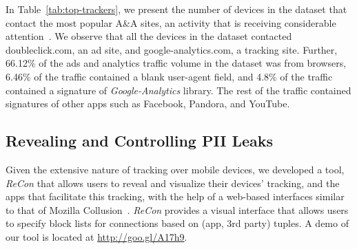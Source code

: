 In Table~\ref{tab:top-trackers}, we present the number of devices in the \mobWild dataset that contact the most popular A\&A sites, an activity that is receiving considerable attention~\cite{roesner:webtrackers,leontiadis:mobileads,vallina-rod:ads}.
We observe that all the devices in the \mobWild dataset contacted doubleclick.com, an ad site, and google-analytics.com, a tracking site. 
Further, 66.12\% of the ads and analytics traffic volume in the \mobWild dataset was from browsers, 6.46\% of the
traffic contained a blank user-agent field, and 4.8\% of the traffic contained a signature of \emph{Google-Analytics} library.
The rest of the traffic contained signatures of other apps such as Facebook, Pandora, and YouTube.

\subsection{Revealing and Controlling PII Leaks}
Given the extensive nature of tracking over mobile devices, we developed a tool, 
\emph{ReCon} that allows users to reveal and visualize their devices' tracking, and the 
apps that facilitate this tracking, with the help of a web-based interfaces similar to that of 
Mozilla Collusion~\cite{collusion}. \emph{ReCon} provides a visual interface that allows 
 users to specify block lists for connections based on (app, 3rd party) tuples. A demo of our tool is 
 located at \url{http://goo.gl/A17h9}. 

